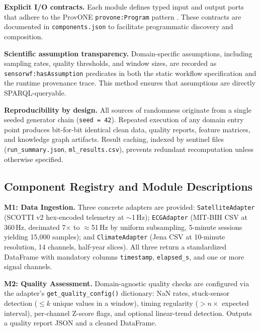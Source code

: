 \documentclass[conference]{IEEEtran}
\begin{document}
\textbf{Explicit I/O contracts.} Each module defines typed input and output ports that adhere to the ProvONE \texttt{provone:Program} pattern \cite{missier2013provone}. These contracts are documented in \texttt{components.json} to facilitate programmatic discovery and composition. 


\textbf{Scientific assumption transparency.} Domain-specific assumptions, including sampling rates, quality thresholds, and window sizes, are recorded as \texttt{sensorwf:hasAssumption} predicates in both the static workflow specification and the runtime provenance trace. This method ensures that assumptions are directly SPARQL-queryable.

\textbf{Reproducibility by design.} All sources of randomness originate from a single seeded generator chain (\texttt{seed = 42}). Repeated execution of any domain entry point produces bit-for-bit identical clean data, quality reports, feature matrices, and knowledge graph artifacts. Result caching, indexed by sentinel files (\texttt{run\_summary.json}, \texttt{ml\_results.csv}), prevents redundant recomputation unless otherwise specified.

\subsection{Component Registry and Module Descriptions}

\textbf{M1: Data Ingestion.} Three concrete adapters are provided: \texttt{SatelliteAdapter} (SCOTTI v2 hex-encoded telemetry at $\sim$1\,Hz); \texttt{ECGAdapter} (MIT-BIH CSV at 360\,Hz, decimated 7$\times$ to $\approx$51\,Hz by uniform subsampling, 5-minute sessions yielding 15,000 samples); and \texttt{ClimateAdapter} (Jena CSV at 10-minute resolution, 14 channels, half-year slices). All three return a standardized DataFrame with mandatory columns \texttt{timestamp}, \texttt{elapsed\_s}, and one or more signal channels.

\textbf{M2: Quality Assessment.} Domain-agnostic quality checks are configured via the adapter's \texttt{get\_quality\_config()} dictionary: NaN rates, stuck-sensor detection ($\le k$ unique values in a window), timing regularity ($> n\times$ expected interval), per-channel Z-score flags, and optional linear-trend detection. Outputs a quality report JSON and a cleaned DataFrame.
\end{document}
